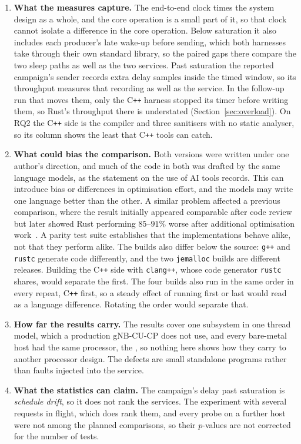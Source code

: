 \documentclass[english,oneside,a4paper,censored,csm,software-track-2020]{HYthesisML}
\begin{document}
\begin{enumerate}[label=\textbf{\arabic*.}, leftmargin=1.6em, itemsep=0.6ex, topsep=0.5ex,
  parsep=0pt]
\item \textbf{What the measures capture.} The end-to-end clock times the system design as a whole,
and the core operation is a small part of it, so that clock cannot isolate a
difference in the core operation. Below saturation it also includes each producer's late
wake-up before sending, which both harnesses take through their own standard library, so the
paired gaps there compare the two sleep paths as well as the two services. Past saturation
the reported campaign's sender
records extra delay samples inside the timed window, so its throughput measures
that recording as well as the service. In the follow-up run that moves them, only
the C\texttt{++} harness stopped its timer before writing them, so Rust's
throughput there is understated (Section~\ref{sec:overload}). On RQ2 the
C\texttt{++} side is the compiler and three sanitisers with no static analyser, so
its column shows the least that C\texttt{++} tools can catch.

\item \textbf{What could bias the comparison.} Both versions were written under one author's direction,
and much of the code in both was drafted by the same language models, as the
statement on the use of AI tools records. This can introduce bias or differences
in optimisation effort, and the models may write one language better than the
other. A similar problem affected a previous comparison, where the result
initially appeared comparable after code review but later showed Rust performing
$85$--$91\%$ worse after additional optimisation work~\cite{emberg2023asn1}. A
parity test suite establishes that the implementations behave alike, not that
they perform alike. The builds also differ below the source: \texttt{g++} and
\texttt{rustc} generate code differently, and the two \texttt{jemalloc} builds
are different releases. Building the C\texttt{++} side with \texttt{clang++},
whose code generator \texttt{rustc} shares, would separate the first. The four builds also
run in the same order in every repeat, C\texttt{++} first, so a steady effect of running
first or last would read as a language difference. Rotating the order would separate that.

\item \textbf{How far the results carry.} The results cover one subsystem in one thread model,
which a production gNB-CU-CP does not use, and every bare-metal host had the same
processor, the \MainCpu{}, so nothing here shows how they carry to another
processor design. The defects are small standalone programs rather than faults
injected into the service.

\item \textbf{What the statistics can claim.} The campaign's delay past saturation
is \emph{schedule drift}, so it does not rank the services. The experiment with
several requests in flight, which does rank them, and every probe on a further
host were not among the planned comparisons, so their $p$-values are not
corrected for the number of tests.
\end{enumerate}
\end{document}
